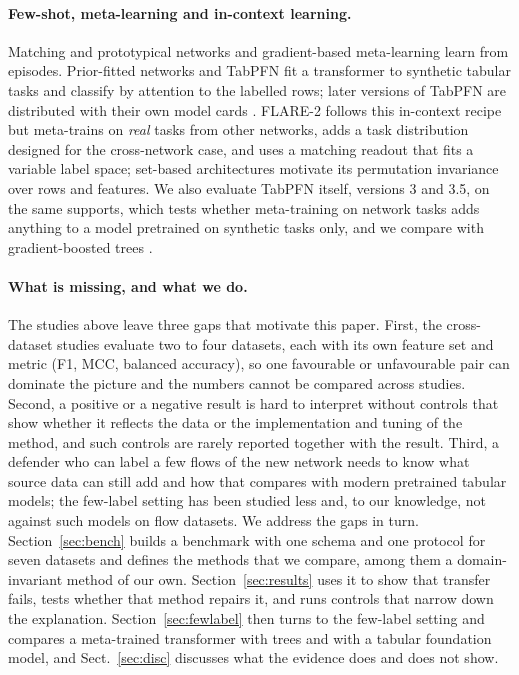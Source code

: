 \documentclass[pdflatex,sn-mathphys-num]{sn-jnl}%
\begin{document}
\paragraph{Few-shot, meta-learning and in-context learning.}
Matching and prototypical networks \citep{vinyals2016matching,snell2017prototypical} and gradient-based meta-learning \citep{finn2017maml} learn from episodes.
Prior-fitted networks \citep{muller2022pfn} and TabPFN \citep{hollmann2025tabpfn} fit a transformer to synthetic tabular tasks and classify by attention to the labelled rows; later versions of TabPFN are distributed with their own model cards \citep{priorlabs2026tabpfn3}.
FLARE-2 follows this in-context recipe but meta-trains on \emph{real} tasks from other networks, adds a task distribution designed for the cross-network case, and uses a matching readout that fits a variable label space; set-based architectures \citep{lee2019settransformer} motivate its permutation invariance over rows and features.
We also evaluate TabPFN itself, versions 3 and 3.5, on the same supports, which tests whether meta-training on network tasks adds anything to a model pretrained on synthetic tasks only, and we compare with gradient-boosted trees \citep{prokhorenkova2018catboost}.

\paragraph{What is missing, and what we do.}
The studies above leave three gaps that motivate this paper.
First, the cross-dataset studies evaluate two to four datasets, each with its own feature set and metric (F1, MCC, balanced accuracy), so one favourable or unfavourable pair can dominate the picture and the numbers cannot be compared across studies.
Second, a positive or a negative result is hard to interpret without controls that show whether it reflects the data or the implementation and tuning of the method, and such controls are rarely reported together with the result.
Third, a defender who can label a few flows of the new network needs to know what source data can still add and how that compares with modern pretrained tabular models; the few-label setting has been studied less and, to our knowledge, not against such models on flow datasets.
We address the gaps in turn.
Section~\ref{sec:bench} builds a benchmark with one schema and one protocol for seven datasets and defines the methods that we compare, among them a domain-invariant method of our own.
Section~\ref{sec:results} uses it to show that transfer fails, tests whether that method repairs it, and runs controls that narrow down the explanation.
Section~\ref{sec:fewlabel} then turns to the few-label setting and compares a meta-trained transformer with trees and with a tabular foundation model, and Sect.~\ref{sec:disc} discusses what the evidence does and does not show.
\end{document}
